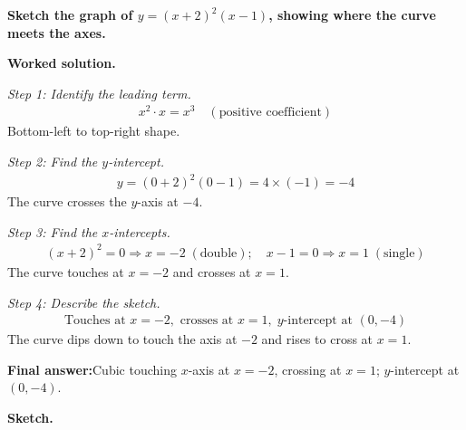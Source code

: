 \documentclass[11pt]{article}
\newcommand{\question}[1]{\par\medskip\noindent\textbf{#1}\par}
\begin{document}
\question{Sketch the graph of \( y = (x + 2)^2(x - 1) \), showing where the curve meets the axes.}

\textbf{Worked solution.}

\textit{Step 1: Identify the leading term.}
\[\begin{gathered}
x^2 \cdot x = x^3 \quad (\text{positive coefficient})
\end{gathered}\]
Bottom-left to top-right shape.

\textit{Step 2: Find the \( y \)-intercept.}
\[\begin{gathered}
y = (0+2)^2(0-1) = 4 \times (-1) = -4
\end{gathered}\]
The curve crosses the \( y \)-axis at \( -4 \).

\textit{Step 3: Find the \( x \)-intercepts.}
\[\begin{gathered}
(x+2)^2 = 0 \Rightarrow x = -2 \;(\text{double}); \quad x - 1 = 0 \Rightarrow x = 1 \;(\text{single})
\end{gathered}\]
The curve touches at \( x = -2 \) and crosses at \( x = 1 \).

\textit{Step 4: Describe the sketch.}
\[\begin{gathered}
\text{Touches at } x = -2, \text{ crosses at } x = 1, \; y\text{-intercept at } (0,-4)
\end{gathered}\]
The curve dips down to touch the axis at \( -2 \) and rises to cross at \( x = 1 \).

\begin{answerbox}
\textbf{Final answer:}\quad Cubic touching \(\displaystyle x\)-axis at \(\displaystyle x = -2\), crossing at \(\displaystyle x = 1\); \(\displaystyle y\)-intercept at \(\displaystyle (0, -4)\).
\end{answerbox}
\textbf{Sketch.}
\end{document}

